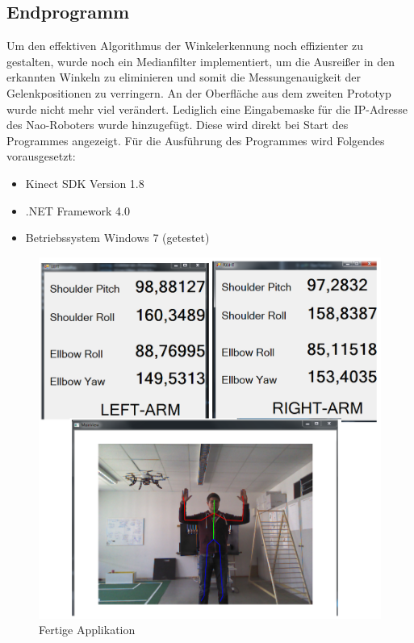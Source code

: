 \subsection{Endprogramm}
Um den effektiven Algorithmus der Winkelerkennung noch effizienter zu gestalten, wurde noch ein Medianfilter implementiert, um die Ausreißer in den erkannten Winkeln zu eliminieren und somit die Messungenauigkeit der Gelenkpositionen zu verringern.
\newline
An der Oberfläche aus dem zweiten Prototyp wurde nicht mehr viel verändert. Lediglich eine Eingabemaske für die IP-Adresse des Nao-Roboters wurde hinzugefügt. Diese wird direkt bei Start des Programmes angezeigt.
Für die Ausführung des Programmes wird Folgendes vorausgesetzt:

\begin{itemize}
	\item Kinect SDK Version 1.8
	\item .NET Framework 4.0
	\item Betriebssystem Windows 7 (getestet)
\end{itemize}



\begin{figure}[H]						
	\centering							
	\includegraphics[scale=0.4]{Bilder/Programm.png}
	\caption{Fertige Applikation}						
	\label{f:programm}						
\end{figure}


